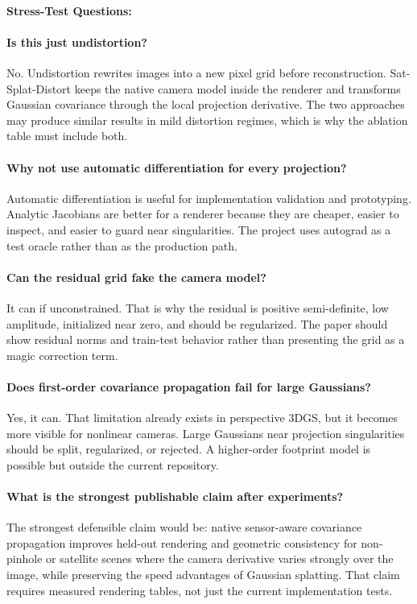 \documentclass{article}
\begin{document}
\paragraph{Stress-Test Questions:}

\paragraph{Is this just undistortion?}
No. Undistortion rewrites images into a new pixel grid before reconstruction. Sat-Splat-Distort keeps the native camera model inside the renderer and transforms Gaussian covariance through the local projection derivative. The two approaches may produce similar results in mild distortion regimes, which is why the ablation table must include both.

\paragraph{Why not use automatic differentiation for every projection?}
Automatic differentiation is useful for implementation validation and prototyping. Analytic Jacobians are better for a renderer because they are cheaper, easier to inspect, and easier to guard near singularities. The project uses autograd as a test oracle rather than as the production path.

\paragraph{Can the residual grid fake the camera model?}
It can if unconstrained. That is why the residual is positive semi-definite, low amplitude, initialized near zero, and should be regularized. The paper should show residual norms and train-test behavior rather than presenting the grid as a magic correction term.

\paragraph{Does first-order covariance propagation fail for large Gaussians?}
Yes, it can. That limitation already exists in perspective 3DGS, but it becomes more visible for nonlinear cameras. Large Gaussians near projection singularities should be split, regularized, or rejected. A higher-order footprint model is possible but outside the current repository.

\paragraph{What is the strongest publishable claim after experiments?}
The strongest defensible claim would be: native sensor-aware covariance propagation improves held-out rendering and geometric consistency for non-pinhole or satellite scenes where the camera derivative varies strongly over the image, while preserving the speed advantages of Gaussian splatting. That claim requires measured rendering tables, not just the current implementation tests.
\end{document}
